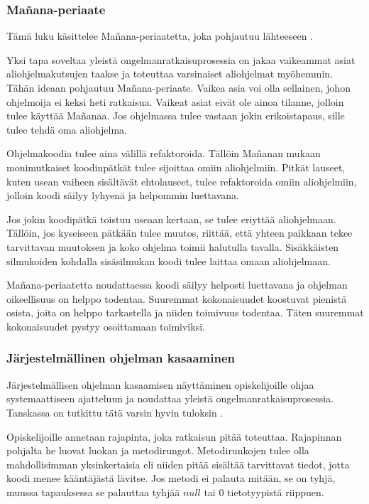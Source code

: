 \subsubsection{Mañana-periaate}

Tämä luku käsittelee Mañana-periaatetta, joka pohjautuu lähteeseen
\cite{Caspersen:2006:NPO:1176617.1176741}.

Yksi tapa soveltaa yleistä ongelmanratkaisuprosessia on jakaa vaikeammat asiat
aliohjelmakutsujen taakse ja toteuttaa varsinaiset aliohjelmat myöhemmin. Tähän
ideaan pohjautuu Mañana-periaate. Vaikea asia voi olla sellainen, johon
ohjelmoija ei keksi heti ratkaisua. Vaikeat asiat eivät ole ainoa tilanne,
jolloin tulee käyttää Mañanaa. Jos ohjelmassa tulee vastaan jokin erikoistapaus,
sille tulee tehdä oma aliohjelma.

Ohjelmakoodia tulee aina välillä refaktoroida. Tällöin Mañanan mukaan
monimutkaiset koodinpätkät tulee sijoittaa omiin aliohjelmiin. Pitkät lauseet,
kuten usean vaiheen sisältävät ehtolauseet, tulee refaktoroida omiin aliohjelmiin, jolloin koodi säilyy lyhyenä ja helpommin luettavana.

Jos jokin koodipätkä toistuu useaan kertaan, se tulee eriyttää aliohjelmaan.
Tällöin, jos kyseiseen pätkään tulee muutos, riittää, että yhteen paikkaan tekee
tarvittavan muutoksen ja koko ohjelma toimii halutulla tavalla. Sisäkkäisten
silmukoiden kohdalla sisäsilmukan koodi tulee laittaa omaan aliohjelmaan.

Mañana-periaatetta noudattaessa koodi säilyy helposti luettavana ja ohjelman
oikeellisuus on helppo todentaa. Suuremmat kokonaisuudet koostuvat pienistä
osista, joita on helppo tarkastella ja niiden toimivuus todentaa. Täten
suuremmat kokonaisuudet pystyy osoittamaan toimiviksi.

\subsubsection{Järjestelmällinen ohjelman kasaaminen}

\label{järjestelmällisyyteen pohjautuva ongelmanratkaisuprosessi}

Järjestelmällisen ohjelman kasaamisen näyttäminen opiskelijoille ohjaa
systemaattiseen ajatteluun ja noudattaa yleistä ongelmanratkaisuprosessia.
Tanskassa on tutkittu tätä varsin hyvin tuloksin
\cite{Caspersen:2006:NPO:1176617.1176741}.

Opiskelijoille annetaan rajapinta, joka ratkaisun pitää toteuttaa. Rajapinnan
pohjalta he luovat luokan ja metodirungot. Metodirunkojen tulee olla
mahdollisimman yksinkertaisia eli niiden pitää sisältää tarvittavat tiedot,
jotta koodi menee kääntäjästä lävitse. Jos metodi ei palauta mitään, se on
tyhjä, muussa tapauksessa se palauttaa tyhjää $null$ tai $0$ tietotyypistä
riippuen.

